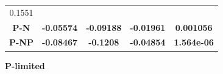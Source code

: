 \documentclass[]{article}
\begin{document}
\begin{longtable}[]{@{}ccccc@{}}
\begin{minipage}[t]{0.16\columnwidth}
0.1551\strut
\end{minipage}\tabularnewline
\begin{minipage}[t]{0.13\columnwidth}\centering\strut
\textbf{P-N}\strut
\end{minipage} & \begin{minipage}[t]{0.16\columnwidth}\centering\strut
\textbf{-0.05574}\strut
\end{minipage} & \begin{minipage}[t]{0.16\columnwidth}\centering\strut
\textbf{-0.09188}\strut
\end{minipage} & \begin{minipage}[t]{0.16\columnwidth}\centering\strut
\textbf{-0.01961}\strut
\end{minipage} & \begin{minipage}[t]{0.16\columnwidth}\centering\strut
\textbf{0.001056}\strut
\end{minipage}\tabularnewline
\begin{minipage}[t]{0.13\columnwidth}\centering\strut
\textbf{P-NP}\strut
\end{minipage} & \begin{minipage}[t]{0.16\columnwidth}\centering\strut
\textbf{-0.08467}\strut
\end{minipage} & \begin{minipage}[t]{0.16\columnwidth}\centering\strut
\textbf{-0.1208}\strut
\end{minipage} & \begin{minipage}[t]{0.16\columnwidth}\centering\strut
\textbf{-0.04854}\strut
\end{minipage} & \begin{minipage}[t]{0.16\columnwidth}\centering\strut
\textbf{1.564e-06}\strut
\end{minipage}\tabularnewline
\bottomrule
\end{longtable}

\textbf{P-limited}
\end{document}
